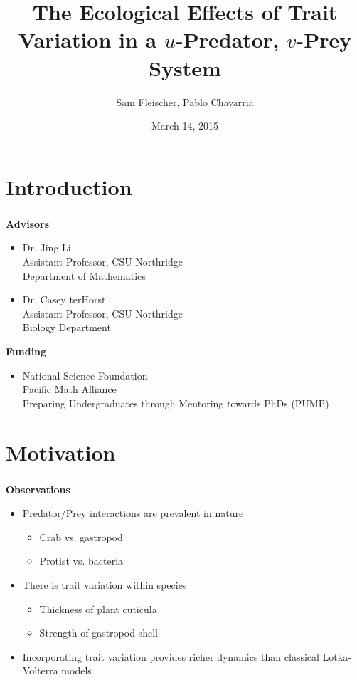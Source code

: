\documentclass[10pt]{beamer}
\title{The Ecological Effects of Trait Variation in a $u$-Predator, $v$-Prey System}
\author{Sam Fleischer, Pablo Chavarria}
\date{March 14, 2015}
\begin{document}
\begin{frame}
	\titlepage
\end{frame}

\section{Introduction}
\begin{frame}
	\frametitle{}
	{\bf Advisors}
	\begin{itemize}
		\item Dr. Jing Li \\
		Assistant Professor, CSU Northridge \\
		Department of Mathematics
		\item Dr. Casey terHorst \\
		Assistant Professor, CSU Northridge \\
		Biology Department
	\end{itemize}
	{\bf Funding}
	\begin{itemize}
		\item National Science Foundation \\
		Pacific Math Alliance \\
		Preparing Undergraduates through Mentoring towards PhDs (PUMP)
	\end{itemize}
\end{frame}

\section{Motivation}
\begin{frame}
	\frametitle{}
	{\bf Observations}
	\begin{itemize}
		\item Predator/Prey interactions are prevalent in nature
		\begin{itemize}
			\item Crab vs. gastropod
			\item Protist vs. bacteria
		\end{itemize}
		\item There is trait variation within species
		\begin{itemize}
			\item Thickness of plant cuticula
			\item Strength of gastropod shell
		\end{itemize}
		\item Incorporating trait variation provides richer dynamics than classical Lotka-Volterra models
	\end{itemize}
\end{frame}
\end{document}
